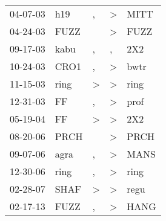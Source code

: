 \begin{supertabular}{p{0.07\textwidth}p{0.06\textwidth}p{0.02\textwidth}p{0.02\textwidth}p{0.06\textwidth}}
 04-07-03\textsuperscript{} &   h19\textsuperscript{} &             , &  \textgreater &  MITT\textsuperscript{} \\
 04-24-03\textsuperscript{} &  FUZZ\textsuperscript{} &               &  \textgreater &  FUZZ\textsuperscript{} \\
 09-17-03\textsuperscript{} &  kabu\textsuperscript{} &             , &             , &   2X2\textsuperscript{} \\
 10-24-03\textsuperscript{} &  CRO1\textsuperscript{} &             , &  \textgreater &  bwtr\textsuperscript{} \\
 11-15-03\textsuperscript{} &  ring\textsuperscript{} &  \textgreater &  \textgreater &  ring\textsuperscript{} \\
 12-31-03\textsuperscript{} &    FF\textsuperscript{} &             , &  \textgreater &  prof\textsuperscript{} \\
 05-19-04\textsuperscript{} &    FF\textsuperscript{} &  \textgreater &  \textgreater &   2X2\textsuperscript{} \\
 08-20-06\textsuperscript{} &  PRCH\textsuperscript{} &               &  \textgreater &  PRCH\textsuperscript{} \\
 09-07-06\textsuperscript{} &  agra\textsuperscript{} &             , &  \textgreater &  MANS\textsuperscript{} \\
 12-30-06\textsuperscript{} &  ring\textsuperscript{} &             , &  \textgreater &  ring\textsuperscript{} \\
 02-28-07\textsuperscript{} &  SHAF\textsuperscript{} &  \textgreater &  \textgreater &  regu\textsuperscript{} \\
 02-17-13\textsuperscript{} &  FUZZ\textsuperscript{} &             , &  \textgreater &  HANG\textsuperscript{} \\
\end{supertabular}
